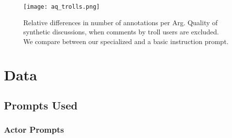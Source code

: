 \begin{figure}[t]
	\centering
	\texttt{[image: aq\_trolls.png]}
	\caption{Relative differences in number of annotations per Arg. Quality of synthetic discussions, when comments by troll users are excluded. We compare between our specialized and a basic instruction prompt.}
	\label{fig:aq_trolls}
\end{figure}



\section{Data}

\subsection{Prompts Used}
\label{ssec:appendix:prompts}
    
\subsubsection{Actor Prompts}
\label{sssec:appendix:actors}

